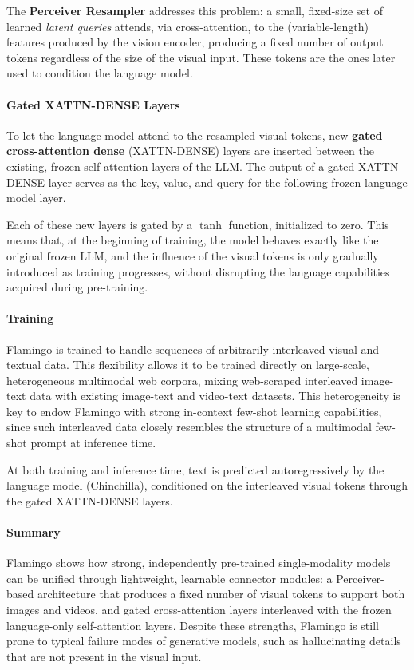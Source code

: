 The \textbf{Perceiver Resampler} addresses this problem: a small, fixed-size set of learned \emph{latent queries} attends, via cross-attention, to the (variable-length) features produced by the vision encoder, producing a fixed number of output tokens regardless of the size of the visual input. These tokens are the ones later used to condition the language model.

\paragraph{Gated XATTN-DENSE Layers} To let the language model attend to the resampled visual tokens, new \textbf{gated cross-attention dense} (XATTN-DENSE) layers are inserted between the existing, frozen self-attention layers of the LLM.
The output of a gated XATTN-DENSE layer serves as the key, value, and query for the following frozen language model layer.

Each of these new layers is gated by a $\tanh$ function, initialized to zero. This means that, at the beginning of training, the model behaves exactly like the original frozen LLM, and the influence of the visual tokens is only gradually introduced as training progresses, without disrupting the language capabilities acquired during pre-training.

\paragraph{Training} Flamingo is trained to handle sequences of arbitrarily interleaved visual and textual data. This flexibility allows it to be trained directly on large-scale, heterogeneous multimodal web corpora, mixing web-scraped interleaved image-text data with existing image-text and video-text datasets.
This heterogeneity is key to endow Flamingo with strong in-context few-shot learning capabilities, since such interleaved data closely resembles the structure of a multimodal few-shot prompt at inference time.

At both training and inference time, text is predicted autoregressively by the language model (Chinchilla), conditioned on the interleaved visual tokens through the gated XATTN-DENSE layers.

\paragraph{Summary} Flamingo shows how strong, independently pre-trained single-modality models can be unified through lightweight, learnable connector modules: a Perceiver-based architecture that produces a fixed number of visual tokens to support both images and videos, and gated cross-attention layers interleaved with the frozen language-only self-attention layers.
Despite these strengths, Flamingo is still prone to typical failure modes of generative models, such as hallucinating details that are not present in the visual input.

